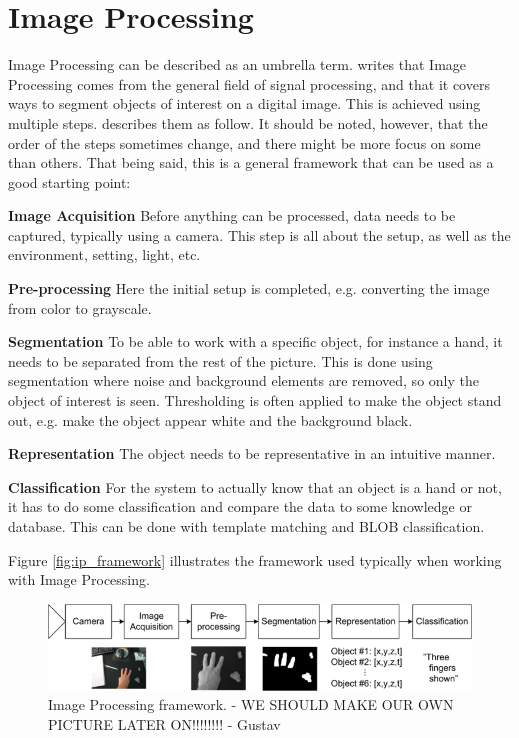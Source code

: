 
\section{Image Processing}
Image Processing can be described as an umbrella term. \citep{ip_book} writes that Image Processing comes from the general field of signal processing, and that it covers ways to segment objects of interest on a digital image. This is achieved using multiple steps. \citep{ip_book} describes them as follow. It should be noted, however, that the order of the steps sometimes change, and there might be more focus on some than others. That being said, this is a general framework that can be used as a good starting point:

\textbf{Image Acquisition}
Before anything can be processed, data needs to be captured, typically using a camera. This step is all about the setup, as well as the environment, setting, light, etc.

\textbf{Pre-processing}
Here the initial setup is completed, e.g. converting the image from color to grayscale.

\textbf{Segmentation}
To be able to work with a specific object, for instance a hand, it needs to be separated from the rest of the picture. This is done using segmentation where noise and background elements are removed, so only the object of interest is seen. Thresholding is often applied to make the object stand out, e.g. make the object appear white and the background black.

\textbf{Representation}
The object needs to be representative in an intuitive manner.

\textbf{Classification}
For the system to actually know that an object is a hand or not, it has to do some classification and compare the data to some knowledge or database. This can be done with template matching and BLOB classification.

Figure \eqref{fig:ip_framework} illustrates the framework used typically when working with Image Processing.

\begin{figure}[htbp]
\centering
\includegraphics[width=1.00\textwidth]{Pictures/Theory/imageProcessing_steps.png}
\caption{Image Processing framework. - WE SHOULD MAKE OUR OWN PICTURE LATER ON!!!!!!!! - Gustav}
\label{fig:ip_framework}
\end{figure}

